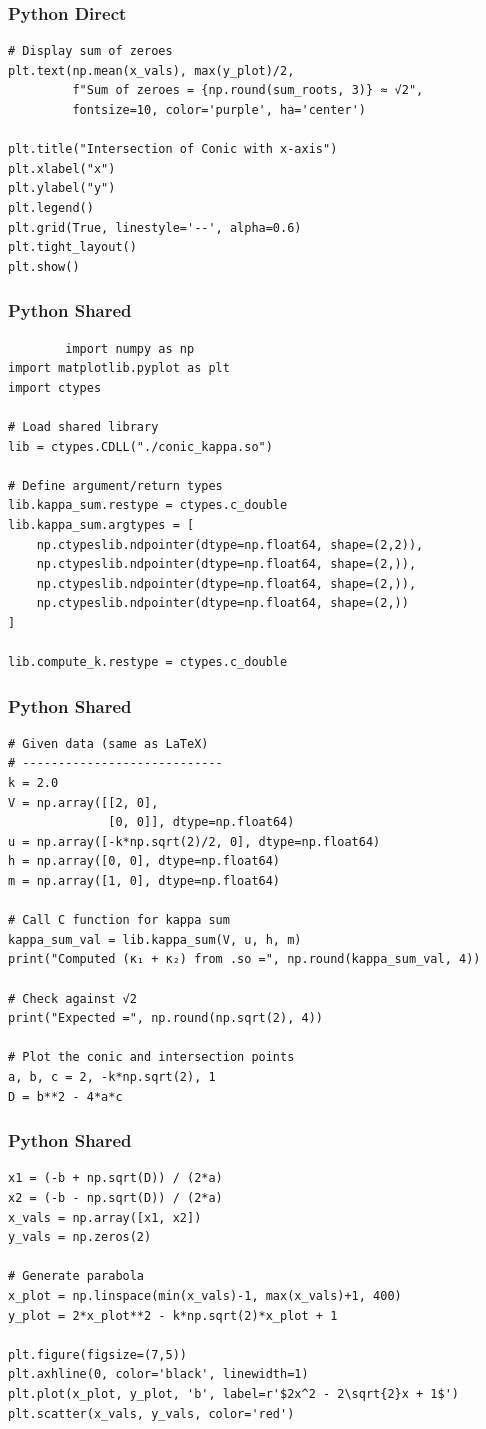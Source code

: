 \documentclass{beamer}
\begin{document}
\begin{frame}[fragile]
    \frametitle{Python Direct}
    \begin{lstlisting}
# Display sum of zeroes
plt.text(np.mean(x_vals), max(y_plot)/2,
         f"Sum of zeroes = {np.round(sum_roots, 3)} ≈ √2",
         fontsize=10, color='purple', ha='center')

plt.title("Intersection of Conic with x-axis")
plt.xlabel("x")
plt.ylabel("y")
plt.legend()
plt.grid(True, linestyle='--', alpha=0.6)
plt.tight_layout()
plt.show()

    \end{lstlisting}
    \end{frame}
    \begin{frame}[fragile]
    \frametitle{Python Shared}
    \begin{lstlisting}
        import numpy as np
import matplotlib.pyplot as plt
import ctypes

# Load shared library
lib = ctypes.CDLL("./conic_kappa.so")

# Define argument/return types
lib.kappa_sum.restype = ctypes.c_double
lib.kappa_sum.argtypes = [
    np.ctypeslib.ndpointer(dtype=np.float64, shape=(2,2)),
    np.ctypeslib.ndpointer(dtype=np.float64, shape=(2,)),
    np.ctypeslib.ndpointer(dtype=np.float64, shape=(2,)),
    np.ctypeslib.ndpointer(dtype=np.float64, shape=(2,))
]

lib.compute_k.restype = ctypes.c_double
 \end{lstlisting}
    \end{frame}
    \begin{frame}[fragile]
    \frametitle{Python Shared}
    \begin{lstlisting}
# Given data (same as LaTeX)
# ----------------------------
k = 2.0
V = np.array([[2, 0],
              [0, 0]], dtype=np.float64)
u = np.array([-k*np.sqrt(2)/2, 0], dtype=np.float64)
h = np.array([0, 0], dtype=np.float64)
m = np.array([1, 0], dtype=np.float64)

# Call C function for kappa sum
kappa_sum_val = lib.kappa_sum(V, u, h, m)
print("Computed (κ₁ + κ₂) from .so =", np.round(kappa_sum_val, 4))

# Check against √2
print("Expected =", np.round(np.sqrt(2), 4))

# Plot the conic and intersection points
a, b, c = 2, -k*np.sqrt(2), 1
D = b**2 - 4*a*c
 \end{lstlisting}
    \end{frame}
    \begin{frame}[fragile]
    \frametitle{Python Shared}
    \begin{lstlisting}
x1 = (-b + np.sqrt(D)) / (2*a)
x2 = (-b - np.sqrt(D)) / (2*a)
x_vals = np.array([x1, x2])
y_vals = np.zeros(2)

# Generate parabola
x_plot = np.linspace(min(x_vals)-1, max(x_vals)+1, 400)
y_plot = 2*x_plot**2 - k*np.sqrt(2)*x_plot + 1

plt.figure(figsize=(7,5))
plt.axhline(0, color='black', linewidth=1)
plt.plot(x_plot, y_plot, 'b', label=r'$2x^2 - 2\sqrt{2}x + 1$')
plt.scatter(x_vals, y_vals, color='red')
 \end{lstlisting}
    \end{frame}
\end{document}
